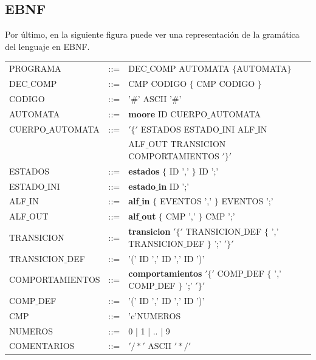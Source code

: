 \documentclass[12pt,a4paper]{article}
\begin{document}
\subsection{EBNF}
Por último, en la siguiente figura puede ver una representación de la gramática del lenguaje en EBNF.

			\begin{center}
			\begin{tabular}{lcl}
	

				PROGRAMA & ::= & DEC$\_$COMP AUTOMATA $\{$AUTOMATA$\}$ \\ 
				 
				
				DEC$\_$COMP & ::= &CMP  CODIGO $\{$ CMP CODIGO $\}$ \\ 
			
				CODIGO 	&::= &'$\#$' ASCII '$\#$' \\ 
				
				AUTOMATA & ::= & \textbf{moore} ID CUERPO$\_$AUTOMATA \\
				
			
				CUERPO$\_$AUTOMATA	& ::= & $'\{'$ ESTADOS ESTADO$\_$INI ALF$\_$IN  \\ 
				
					& &  ALF$\_$OUT TRANSICION COMPORTAMIENTOS $'\}'$ \\ 
				
				ESTADOS	& ::= &   \textbf{estados} $\{$ ID ',' $\}$ ID ';'\\ 
				
				 ESTADO$\_$INI &::= & \textbf{estado$\_$in} ID ';'\\ 
				 
				ALF$\_$IN &::= & \textbf{alf$\_$in}  $\{$ EVENTOS ',' $\}$ EVENTOS ';' \\ 
				
				ALF$\_$OUT & ::= &\textbf{alf$\_$out}  $\{$ CMP ',' $\}$ CMP ';'  \\ 
				
				TRANSICION 	 & ::= & \textbf{transicion} $'\{'$ TRANSICION$\_$DEF $\{$ ',' TRANSICION$\_$DEF  $\}$ ';' $'\}'$ \\ 
				
				TRANSICION$\_$DEF & ::= & '(' ID ',' ID ',' ID ')' \\ 
			
				
				COMPORTAMIENTOS	 & ::= &  \textbf{comportamientos} $'\{'$ COMP$\_$DEF $\{$ ',' COMP$\_$DEF $\}$ ';' $'\}'$\\ 
				
				COMP$\_$DEF &  ::= & '(' ID ',' ID ',' ID ')' \\ 
				
				
				CMP  & ::= & 'c'NUMEROS \\ 
				
				NUMEROS &::= & 0 | 1 | .. | 9 \\ 
				
				COMENTARIOS & ::=  & $'/\ast'$ ASCII $'\ast/'$ \\
				
				
			\end{tabular} 	
		\end{center}
	
\end{document}
